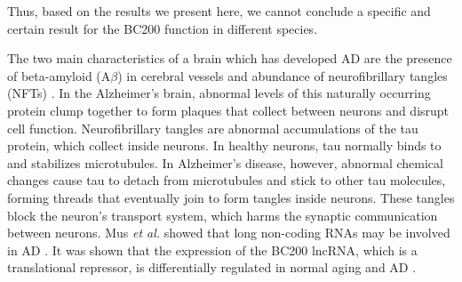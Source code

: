 \documentclass[conference, 11pt]{IEEEtran}
\begin{document}
{Thus, based on the results we present here, we cannot conclude a specific and certain result for the BC200 function in different species.

The two main characteristics of a brain which has developed AD are the presence of beta-amyloid (A$\beta$) in cerebral vessels and abundance of neurofibrillary tangles (NFTs) \cite{deture2019neuropathological}. 
In the Alzheimer’s brain, abnormal levels of this naturally occurring protein clump together to form plaques that collect between neurons and disrupt cell function. 
Neurofibrillary tangles are abnormal accumulations of the tau protein, which collect inside neurons.  
In healthy neurons, tau normally binds to and stabilizes microtubules. 
In Alzheimer’s disease, however, abnormal chemical changes cause tau to detach from microtubules and stick to other tau molecules, forming threads that eventually join to form tangles inside neurons. 
These tangles block the neuron’s transport system, which harms the synaptic communication between neurons\cite{swerdlow2011brain}. 
Mus \emph{et al.} showed that long non-coding RNAs may be involved in AD \cite{mus2007dendritic}. 
It was shown that the expression of the BC200 lncRNA, which is a translational repressor, is differentially regulated in normal aging and AD \cite{mus2007dendritic}. 

}
\end{document}
